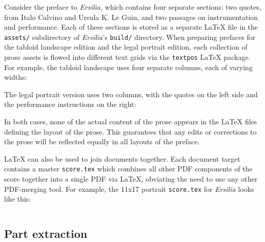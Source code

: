 Consider the preface to \emph{Ersilia}, which contains four separate sections:
two quotes, from Italo Calvino and Ursula K. Le Guin, and two passages on
instrumentation and performance. Each of these sections is stored as a separate
LaTeX file in the \texttt{assets/} subdirectory of \emph{Ersilia}'s
\texttt{build/} directory. When preparing prefaces for the tabloid landscape
edition and the legal portrait edition, each collection of prose assets is
flowed into different text grids via the \texttt{textpos} LaTeX package. For
example, the tabloid landscape uses four separate columns, each of varying
widths:


\noindent The legal portrait version uses two columns, with the quotes on the
left side and the performance instructions on the right:


\noindent In both cases, none of the actual content of the prose appears in the
LaTeX files defining the layout of the prose. This guarantees that any edits or
corrections to the prose will be reflected equally in all layouts of the
preface.

LaTeX can also be used to join documents together. Each document target
contains a master \texttt{score.tex} which combines all other PDF components of
the score together into a single PDF via LaTeX, obviating the need to use any
other PDF-merging tool. For example, the 11x17 portrait \texttt{score.tex} for
\emph{Ersilia} looks like this:

\begin{singlespacing}
\vspace{-0.5\baselineskip}
\inputminted{tex}{../../Documents/Scores/ersilia/ersilia/build/11x17-portrait/ersilia-11x17-portrait-score.tex}
\end{singlespacing}

\subsection{Part extraction}
\label{ssec:part-extraction}

